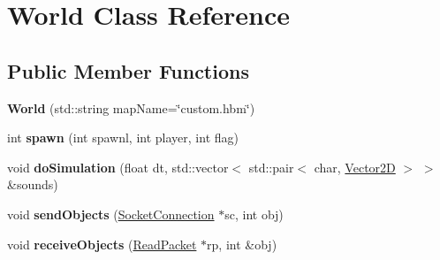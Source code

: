 \hypertarget{class_world}{\section{World Class Reference}
\label{class_world}
}
\subsection*{Public Member Functions}
\begin{DoxyCompactItemize}
\item 
\hypertarget{class_world_a927865dd19c6a03b0d3b481ae03775c3}{{\bfseries World} (std\-::string map\-Name=\char`\"{}custom.\-hbm\char`\"{})}\label{class_world_a927865dd19c6a03b0d3b481ae03775c3}

\item 
\hypertarget{class_world_af852886a613927fb0e1ca4b33a14f303}{int {\bfseries spawn} (int spawnl, int player, int flag)}\label{class_world_af852886a613927fb0e1ca4b33a14f303}

\item 
\hypertarget{class_world_a587f1be5d3b3237a5c00714ec17e39a9}{void {\bfseries do\-Simulation} (float dt, std\-::vector$<$ std\-::pair$<$ char, \hyperlink{class_vector2_d}{Vector2\-D} $>$ $>$ \&sounds)}\label{class_world_a587f1be5d3b3237a5c00714ec17e39a9}

\item 
\hypertarget{class_world_ada6d1ec2f526a8529a709f5ce6fa2a0a}{void {\bfseries send\-Objects} (\hyperlink{class_socket_connection}{Socket\-Connection} $\ast$sc, int obj)}\label{class_world_ada6d1ec2f526a8529a709f5ce6fa2a0a}

\item 
\hypertarget{class_world_a2235107a1f2470dc270c2bfa3cf0ac51}{void {\bfseries receive\-Objects} (\hyperlink{class_read_packet}{Read\-Packet} $\ast$rp, int \&obj)}\label{class_world_a2235107a1f2470dc270c2bfa3cf0ac51}

\end{DoxyCompactItemize}
